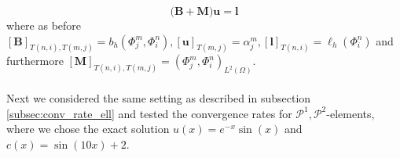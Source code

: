 \begin{equation}
	\label{eq:elliptic_matrix_vect_system_with_mass}
	\Big( \textbf{B} + \textbf{M} \Big) \textbf{u} = \textbf{l}
\end{equation}
where as before 
$ [\textbf{B}]_{T(n,i), T(m,j)} = b_h(\Phi_j^m, \Phi_i^n),
	[\textbf{u}]_{T(m,j)} = \alpha_j^m,
	[\textbf{l}]_{T(n,i)} = \ell_h(\Phi_i^n)$ and furthermore
$ [\textbf{M}]_{T(n,i), T(m,j)} = (\Phi_j^m, \Phi_i^n)_{L^2(\Omega)}$.
\\ \\
Next we considered the same setting as described in subsection \ref{subsec:conv_rate_ell} and tested the convergence rates for $\mathcal{P}^1,\mathcal{P}^2$-elements,
where we chose the exact solution $u(x) = e^{-x}\sin(x)$ and $c(x) = \sin(10x) + 2$.

\begin{figure}[h!]
    \centering
    

\end{figure}
